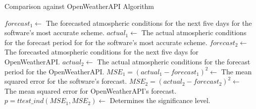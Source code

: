 \begin{algorithm}[H]
    \caption{Comparison against OpenWeatherAPI Algorithm}
    \begin{algorithmic}[1]
        \State $ forecast_{1} \gets $ The forecasted atmospheric conditions for the next five days for the software's most accurate scheme. 
        \State $ actual_{1} \gets $ The actual atmospheric conditions for the forecast period for for the software's most accurate scheme.
        \State $ forecast_{2} \gets $ The forecasted atmospheric conditions for the next five days for OpenWeatherAPI. 
        \State $ actual_{2} \gets $ The actual atmospheric conditions for the forecast period for the OpenWeatherAPI.
        \State $MSE_{1} = (actual_{1} - forecast_{1})^2 \gets$ The mean squared error for the software's forecast.
        \State $MSE_{2} = (actual_{2} - forecast_{2})^2 \gets$ The mean squared error for OpenWeatherAPI's forecast.
        \State $p = ttest\_ind(MSE_{1}, MSE_{2}) \gets $ Determines the significance level.
    \end{algorithmic}
\end{algorithm}
